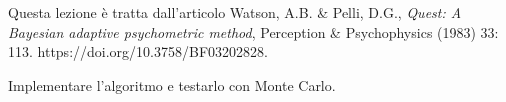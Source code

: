 
Questa lezione è tratta dall'articolo
Watson, A.B. \& Pelli, D.G., \emph{Quest: A Bayesian adaptive psychometric method}, Perception \& Psychophysics (1983) 33: 113. https://doi.org/10.3758/BF03202828.

\begin{exercise}
	Implementare l'algoritmo e testarlo con Monte Carlo.
\end{exercise}
